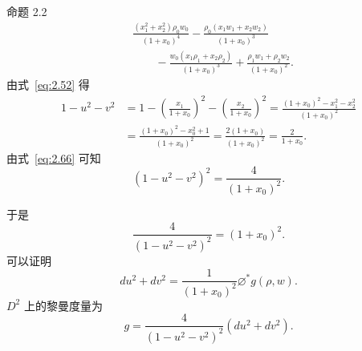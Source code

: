 \begin{statement}{命题 2.2}{}
\begin{equation*}
  \begin{aligned}
    &\frac{(x_1^2+x_2^2)\rho_0w_0}{(1+x_0)^4}
       -\frac{\rho_0(x_1w_1+x_2w_2)}{(1+x_0)^3}\\
    &\qquad-\frac{w_0(x_1\rho_1+x_2\rho_2)}{(1+x_0)^3}
       +\frac{\rho_1w_1+\rho_2w_2}{(1+x_0)^2}.
  \end{aligned}
  \tag{2.65}\label{eq:2.65}
\end{equation*}
由式~\eqref{eq:2.52} 得
\begin{equation*}
  \begin{aligned}
    1-u^2-v^2&=1-\left(\frac{x_1}{1+x_0}\right)^2
                 -\left(\frac{x_2}{1+x_0}\right)^2
      =\frac{(1+x_0)^2-x_1^2-x_2^2}{(1+x_0)^2}\\
    &=\frac{(1+x_0)^2-x_0^2+1}{(1+x_0)^2}
      =\frac{2(1+x_0)}{(1+x_0)^2}
      =\frac{2}{1+x_0}.
  \end{aligned}
  \tag{2.66}\label{eq:2.66}
\end{equation*}
由式~\eqref{eq:2.66} 可知
\begin{equation*}
  (1-u^2-v^2)^2=\frac{4}{(1+x_0)^2}.
  \tag{2.67}\label{eq:2.67}
\end{equation*}

于是
\begin{equation*}
  \frac{4}{(1-u^2-v^2)^2}=(1+x_0)^2.
  \tag{2.68}\label{eq:2.68}
\end{equation*}
可以证明
\begin{equation*}
  du^2+dv^2=\frac{1}{(1+x_0)^2}\varnothing^*g(\rho,w).
  \tag{2.69}\label{eq:2.69}
\end{equation*}
$D^2$ 上的黎曼度量为
\begin{equation*}
  g=\frac{4}{(1-u^2-v^2)^2}(du^2+dv^2).
  \tag{2.70}\label{eq:2.70}
\end{equation*}
\end{statement}
